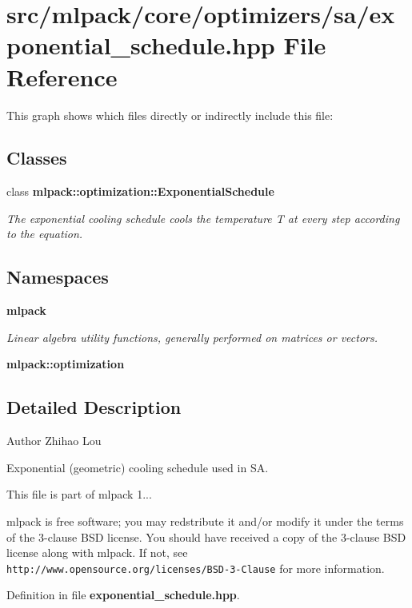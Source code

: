\section{src/mlpack/core/optimizers/sa/exponential\-\_\-schedule.hpp File Reference}
\label{exponential__schedule_8hpp}
This graph shows which files directly or indirectly include this file\-:
\subsection*{Classes}
\begin{DoxyCompactItemize}
\item 
class {\bf mlpack\-::optimization\-::\-Exponential\-Schedule}
\begin{DoxyCompactList}\small\item\em The exponential cooling schedule cools the temperature T at every step according to the equation. \end{DoxyCompactList}\end{DoxyCompactItemize}
\subsection*{Namespaces}
\begin{DoxyCompactItemize}
\item 
{\bf mlpack}
\begin{DoxyCompactList}\small\item\em Linear algebra utility functions, generally performed on matrices or vectors. \end{DoxyCompactList}\item 
{\bf mlpack\-::optimization}
\end{DoxyCompactItemize}


\subsection{Detailed Description}
\begin{DoxyAuthor}{Author}
Zhihao Lou
\end{DoxyAuthor}
Exponential (geometric) cooling schedule used in S\-A.

This file is part of mlpack 1...

mlpack is free software; you may redstribute it and/or modify it under the terms of the 3-\/clause B\-S\-D license. You should have received a copy of the 3-\/clause B\-S\-D license along with mlpack. If not, see {\tt http\-://www.\-opensource.\-org/licenses/\-B\-S\-D-\/3-\/\-Clause} for more information. 

Definition in file {\bf exponential\-\_\-schedule.\-hpp}.

